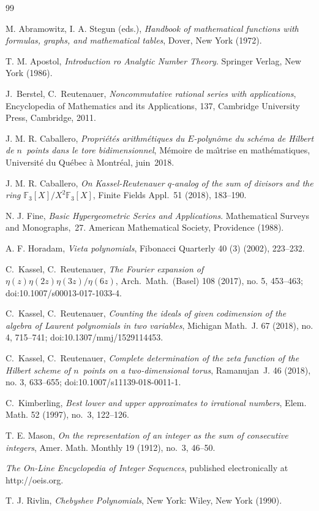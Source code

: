 \documentclass[11pt, a4paper]{amsart}
\theoremstyle{definition}
\newcommand\FF{\mathbb{F}}
\numberwithin{equation}{section}
\begin{document}
\begin{thebibliography}{99}

M. Abramowitz, I. A. Stegun (eds.),
\emph{Handbook of mathematical functions with formulas, graphs, and mathematical tables},  
Dover, New York (1972).

 T. M. Apostol, 
\emph{Introduction ro Analytic Number Theory}. Springer Verlag, New York (1986). 

 J.~Berstel, C.~Reutenauer, 
\emph{Noncommutative rational series with applications},
Encyclopedia of Mathematics and its Applications, 137, Cambridge University Press, Cambridge, 2011.

 J. M. R. Caballero,
\emph{Propri\'et\'es arithm\'etiques du $E$-polyn\^ome du sch\'ema de Hilbert de $n$~points dans le tore bidimensionnel},
M\'emoire de ma\^\i trise en math\'ematiques, Universit\'e du Qu\'ebec \`a Montr\'eal, juin~2018.

 J. M. R. Caballero,
\emph{On Kassel-Reutenauer $q$-analog of the sum of divisors and the ring $\FF_3[X]/X^2\FF_3[X]$},
Finite Fields Appl.~51 (2018), 183--190.

N. J. Fine, \emph{Basic Hypergeometric Series and Applications}. Mathematical Surveys and Monographs,~27. 
American Mathematical Society, Providence (1988).

A. F. Horadam, \emph{Vieta polynomials}, Fibonacci Quarterly 40 (3) (2002), 223--232.

C.~Kassel, C.~Reutenauer, 
\emph{The Fourier expansion of $\eta(z)\eta(2z)\eta(3z)/\eta(6z)$},
Arch.\ Math.\ (Basel) 108 (2017), no. 5, 453--463; doi:10.1007/s00013-017-1033-4.

C.~Kassel, C.~Reutenauer, 
\emph{Counting the ideals of given codimension of the algebra of Laurent polynomials in two variables},
Michigan Math.~J. 67 (2018), no. 4, 715--741; doi:10.1307/mmj/1529114453.

C.~Kassel, C.~Reutenauer, 
\emph{Complete determination of the zeta function of the Hilbert scheme of $n$~points on a two-dimensional torus},
Ramanujan~J. 46 (2018), no. 3, 633--655; doi:10.1007/s11139-018-0011-1.

C.~Kimberling, 
\emph{Best lower and upper approximates to irrational numbers}, Elem. Math. 52 (1997), no.~3, 122--126.

T. E. Mason, 
\emph{On the representation of an integer as the sum of consecutive integers}, 
Amer. Math. Monthly 19 (1912), no.~3, 46--50.

 \emph{The On-Line Encyclopedia of Integer Sequences}, 
published electronically at http://oeis.org.

T. J. Rivlin, \emph{Chebyshev Polynomials}, New York: Wiley, New York (1990).



\end{thebibliography}
\end{document}
